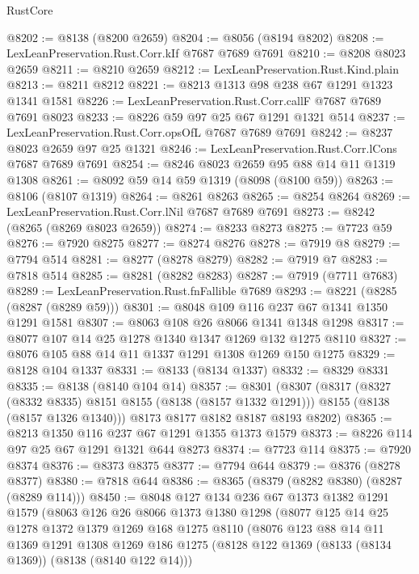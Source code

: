 \begin{lexlean}{RustCore}
\begin{coremodule}
@8202 := @8138 (@8200 @2659)
@8204 := @8056 (@8194 @8202)
@8208 := LexLeanPreservation.Rust.Corr.kIf @7687 @7689 @7691
@8210 := @8208 @8023 @2659
@8211 := @8210 @2659
@8212 := LexLeanPreservation.Rust.Kind.plain
@8213 := @8211 @8212
@8221 := @8213 @1313 @98 @238 @67 @1291 @1323 @1341 @1581
@8226 := LexLeanPreservation.Rust.Corr.callF @7687 @7689 @7691 @8023
@8233 := @8226 @59 @97 @25 @67 @1291 @1321 @514
@8237 := LexLeanPreservation.Rust.Corr.opsOfL @7687 @7689 @7691
@8242 := @8237 @8023 @2659 @97 @25 @1321
@8246 := LexLeanPreservation.Rust.Corr.lCons @7687 @7689 @7691
@8254 := @8246 @8023 @2659 @95 @88 @14 @11 @1319 @1308
@8261 := @8092 @59 @14 @59 @1319 (@8098 (@8100 @59))
@8263 := @8106 (@8107 @1319)
@8264 := @8261 @8263
@8265 := @8254 @8264
@8269 := LexLeanPreservation.Rust.Corr.lNil @7687 @7689 @7691
@8273 := @8242 (@8265 (@8269 @8023 @2659))
@8274 := @8233 @8273
@8275 := @7723 @59
@8276 := @7920 @8275
@8277 := @8274 @8276
@8278 := @7919 @8
@8279 := @7794 @514
@8281 := @8277 (@8278 @8279)
@8282 := @7919 @7
@8283 := @7818 @514
@8285 := @8281 (@8282 @8283)
@8287 := @7919 (@7711 @7683)
@8289 := LexLeanPreservation.Rust.fnFallible @7689
@8293 := @8221 (@8285 (@8287 (@8289 @59)))
@8301 := @8048 @109 @116 @237 @67 @1341 @1350 @1291 @1581
@8307 := @8063 @108 @26 @8066 @1341 @1348 @1298
@8317 := @8077 @107 @14 @25 @1278 @1340 @1347 @1269 @132 @1275 @8110
@8327 := @8076 @105 @88 @14 @11 @1337 @1291 @1308 @1269 @150 @1275
@8329 := @8128 @104 @1337
@8331 := @8133 (@8134 @1337)
@8332 := @8329 @8331
@8335 := @8138 (@8140 @104 @14)
@8357 := @8301
    (@8307
      (@8317
        (@8327 (@8332 @8335) @8151 @8155 (@8138 (@8157 @1332 @1291)))
        @8155
        (@8138 (@8157 @1326 @1340)))
      @8173
      @8177
      @8182
      @8187
      @8193
      @8202)
@8365 := @8213 @1350 @116 @237 @67 @1291 @1355 @1373 @1579
@8373 := @8226 @114 @97 @25 @67 @1291 @1321 @644 @8273
@8374 := @7723 @114
@8375 := @7920 @8374
@8376 := @8373 @8375
@8377 := @7794 @644
@8379 := @8376 (@8278 @8377)
@8380 := @7818 @644
@8386 := @8365 (@8379 (@8282 @8380) (@8287 (@8289 @114)))
@8450 := @8048
    @127
    @134
    @236
    @67
    @1373
    @1382
    @1291
    @1579
    (@8063
      @126
      @26
      @8066
      @1373
      @1380
      @1298
      (@8077
        @125
        @14
        @25
        @1278
        @1372
        @1379
        @1269
        @168
        @1275
        @8110
        (@8076
          @123
          @88
          @14
          @11
          @1369
          @1291
          @1308
          @1269
          @186
          @1275
          (@8128 @122 @1369 (@8133 (@8134 @1369)) (@8138 (@8140 @122 @14)))

\end{coremodule}
\end{lexlean}
